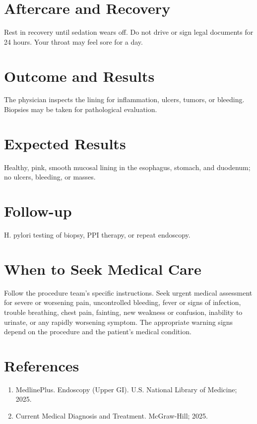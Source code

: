 \section*{Aftercare and Recovery}
Rest in recovery until sedation wears off. Do not drive or sign legal documents for 24 hours. Your throat may feel sore for a day.

\section*{Outcome and Results}
The physician inspects the lining for inflammation, ulcers, tumors, or bleeding. Biopsies may be taken for pathological evaluation.

\section*{Expected Results}
Healthy, pink, smooth mucosal lining in the esophagus, stomach, and duodenum; no ulcers, bleeding, or masses.

\section*{Follow-up}
H. pylori testing of biopsy, PPI therapy, or repeat endoscopy.

\section*{When to Seek Medical Care}
Follow the procedure team's specific instructions. Seek urgent medical assessment for severe or worsening pain, uncontrolled bleeding, fever or signs of infection, trouble breathing, chest pain, fainting, new weakness or confusion, inability to urinate, or any rapidly worsening symptom. The appropriate warning signs depend on the procedure and the patient's medical condition.

\section*{References}
\begin{enumerate}
  \item MedlinePlus. Endoscopy (Upper GI). U.S. National Library of Medicine; 2025.
  \item Current Medical Diagnosis and Treatment. McGraw-Hill; 2025.
\end{enumerate}

\clearpage
